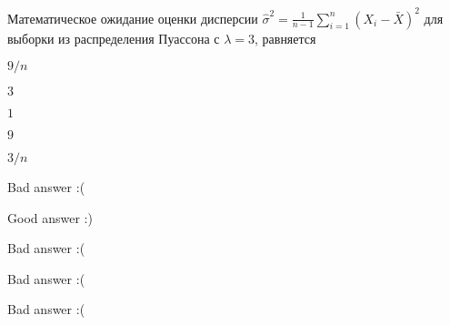 
\begin{question}
Математическое ожидание оценки дисперсии
\(\hat \sigma^2=\frac{1}{n-1}\sum_{i=1}^{n}(X_i - \bar X)^2\) для
выборки из распределения Пуассона с \(\lambda = 3\), равняется
\begin{answerlist}
  \item \(9/n\)
  \item \(3\)
  \item \(1\)
  \item \(9\)
  \item \(3/n\)
\end{answerlist}
\end{question}

\begin{solution}
\begin{answerlist}
  \item Bad answer :(
  \item Good answer :)
  \item Bad answer :(
  \item Bad answer :(
  \item Bad answer :(
\end{answerlist}
\end{solution}

